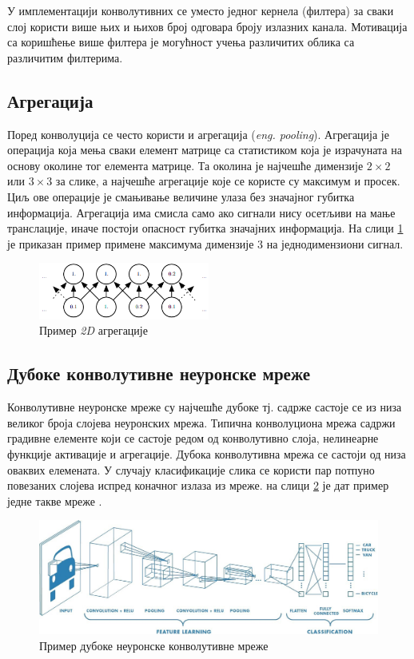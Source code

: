 \documentclass[11pt,oneside]{memoir}
\begin{document}
У имплементацији конволутивних се уместо једног кернела (филтера) за сваки слој користи више њих и њихов број одговара броју излазних канала.
Мотивација са коришћење више филтера је могућност учења различитих облика са различитим филтерима.

\subsection{Агрегација}

Поред конволуција се често користи и агрегација (\textit{eng. pooling}). Агрегација је операција која мења сваки елемент матрице
са статистиком која је израчуната на основу околине тог елемента матрице. Та околина је најчешће димензије $2\times 2$ или $3\times 3$ за слике,
а најчешће агрегације које се користе су максимум и просек. Циљ ове операције је смањивање величине улаза без значајног губитка 
информација. Агрегација има смисла само ако сигнали нису осетљиви на мање транслације, иначе постоји опасност губитка значајних информација. 
На слици \ref{maxpool} је приказан пример примене максимума димензије $3$ на једнодимензиони сигнал.

\begin{figure}[H]
  \centering
  \includegraphics[width=0.5\textwidth]{images/maxpool.png}
  \caption{Пример \textit{2D} агрегације\label{maxpool}}
\end{figure}

\subsection{Дубоке конволутивне неуронске мреже}

Конволутивне неуронске мреже су најчешће дубоке тј. садрже састоје се из низа великог броја слојева неуронских мрежа. Типична конволуциона
мрежа садржи градивне елементе који се састоје редом од конволутивно слоја, нелинеарне функције активације и агрегације. Дубока конволутивна
мрежа се састоји од низа оваквих елемената. У случају класификације слика се користи пар потпуно повезаних слојева испред коначног излаза из мреже.
на слици \ref{dcnn} је дат пример једне такве мреже \cite{deep_learning_goodfellow, ml_mladen}.

\begin{figure}[H]
  \centering
  \includegraphics[width=1.0\textwidth]{images/dcnn.jpeg}
  \caption{Пример дубоке неуронске конволутивне мреже \label{dcnn}}
\end{figure}
\end{document}
